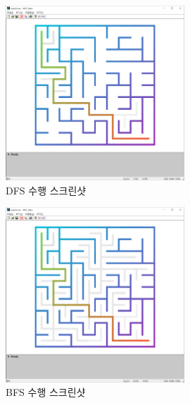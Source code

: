 \begin{figure}
    \centering
        \includegraphics[width=0.6\textwidth]{inc-images/screenshot0}
    \caption{DFS 수행 스크린샷}
    \label{fig:dfs}
\end{figure}

\begin{figure}
    \centering
        \includegraphics[width=0.6\textwidth]{inc-images/screenshot1}
    \caption{BFS 수행 스크린샷}
    \label{fig:bfs}
\end{figure}

\newpage